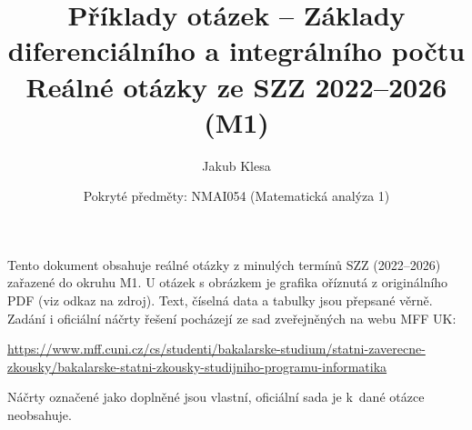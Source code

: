 \documentclass[11pt,a4paper]{article}
\title{Příklady otázek -- Základy diferenciálního a integrálního počtu\\[0.3em]\large Reálné otázky ze SZZ 2022--2026 (M1)}
\author{Jakub Klesa}
\date{Pokryté předměty: NMAI054 (Matematická analýza 1)}
\begin{document}
\maketitle
\tableofcontents
\bigskip

\begin{poznamka}
Tento dokument obsahuje reálné otázky z minulých termínů SZZ (2022--2026) zařazené do
okruhu M1. U otázek s obrázkem je grafika oříznutá z originálního PDF (viz odkaz na
zdroj). Text, číselná data a tabulky jsou přepsané věrně.
Zadání i oficiální náčrty řešení pocházejí ze sad zveřejněných na webu MFF UK:\par
{\raggedright\url{https://www.mff.cuni.cz/cs/studenti/bakalarske-studium/statni-zaverecne-zkousky/bakalarske-statni-zkousky-studijniho-programu-informatika}\par}
Náčrty označené jako doplněné jsou vlastní, oficiální sada je k~dané otázce neobsahuje.
\end{poznamka}
\bigskip







\end{document}
